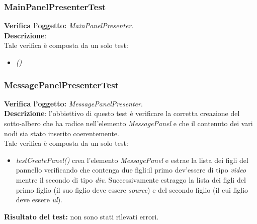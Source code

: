 \subsubsection{MainPanelPresenterTest}
\textbf{Verifica l'oggetto:} \textit{MainPanelPresenter}.\\
\textbf{Descrizione}:\\
Tale verifica è composta da un solo test:
\begin{itemize}
\item \textit{() } %
\end{itemize}

\subsubsection{MessagePanelPresenterTest}
\textbf{Verifica l'oggetto:} \textit{MessagePanelPresenter}.\\
\textbf{Descrizione}: l'obbiettivo di questo test è verificare la corretta creazione del sotto-albero che ha radice nell'elemento \textit{MessagePanel} e che il contenuto dei vari nodi sia stato inserito coerentemente.\\
Tale verifica è composta da un solo test:
\begin{itemize}
\item \textit{testCreatePanel()} crea l'elemento \textit{MessagePanel} e estrae la lista dei figli del pannello verificando che contenga due figli:il primo dev'essere di tipo \textit{video} mentre il secondo di tipo \textit{div}.
Successivamente estraggo la lista dei figli del primo figlio (il suo figlio deve essere \textit{source}) e del secondo figlio (il cui figlio deve essere \textit{ul}).
\end{itemize}
\textbf{Risultato del test:} non sono stati rilevati errori.

